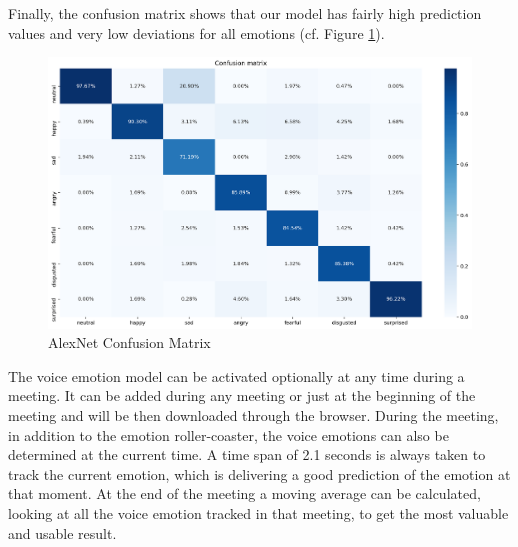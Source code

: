 Finally, the confusion matrix shows that our model has fairly high prediction values and very low deviations for all emotions (cf. Figure \ref{fig:alexnet_confusion_matrix}).

\begin{figure}[h]
\centering
\includegraphics[width=1\textwidth]{assets/alexnet_confusion_matrix.png}
\caption{AlexNet Confusion Matrix}
\label{fig:alexnet_confusion_matrix}
\end{figure}

The voice emotion model can be activated optionally at any time during a meeting. It can be added during any meeting or just at the beginning of the meeting and will be then downloaded through the browser. During the meeting, in addition to the emotion roller-coaster, the voice emotions can also be determined at the current time. A time span of 2.1 seconds is always taken to track the current emotion, which is delivering a good prediction of the emotion at that moment. At the end of the meeting a moving average can be calculated, looking at all the voice emotion tracked in that meeting, to get the most valuable and usable result.  
